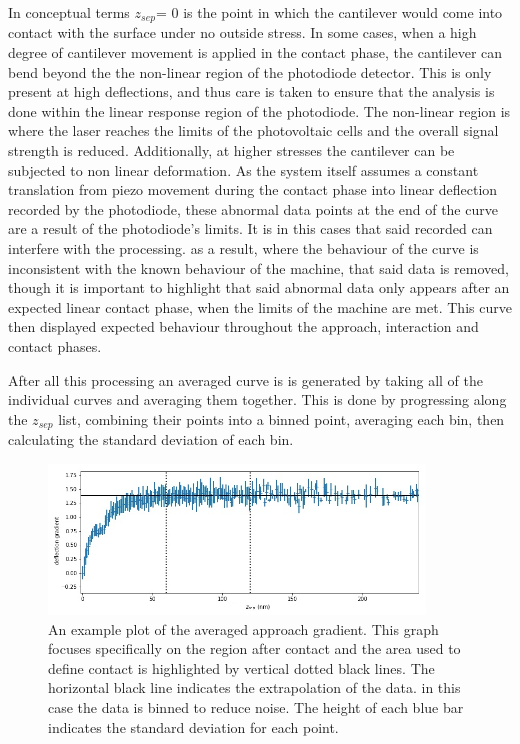 In conceptual terms $z_{sep} \textit{= 0}$ is the point in which the cantilever would come into contact with the surface under no outside stress. In some cases, when a high degree of cantilever movement is applied in the contact phase, the cantilever can bend beyond the the non-linear region of the photodiode detector. This is only present at high deflections, and thus care is taken to ensure that the analysis is done within the linear response region of the photodiode. The non-linear region is where the laser reaches the limits of the photovoltaic cells and the overall signal strength is reduced. Additionally, at higher stresses the cantilever can be subjected to non linear deformation. As the system itself assumes a constant translation from piezo movement during the contact phase into linear deflection recorded by the photodiode, these abnormal data points at the end of the curve are a result of the photodiode's limits. It is in this cases that said recorded can interfere with the processing. as a result, where the behaviour of the curve is inconsistent with the known behaviour of the machine, that said data is removed, though it is important to highlight that said abnormal data only appears after an expected linear contact phase, when the limits of the machine are met. This curve then displayed expected behaviour throughout the approach, interaction and contact phases.

After all this processing an averaged curve is is generated by taking all of the individual curves and averaging them together. This is done by progressing along the $z_{sep}$ list, combining their points into a binned point, averaging each bin, then calculating the standard deviation of each bin.

\begin{figure}[h!!!!]    
        \begin{center}
          \includegraphics[width=100mm]{chapter4/gradientGraph.png}
\end{center}
\caption{An example plot of the averaged approach gradient. This graph focuses specifically on the region after contact and the area used to define contact is highlighted by vertical dotted black lines. The horizontal black line indicates the extrapolation of the data. in this case the data is binned to reduce noise. The height of each blue bar indicates the standard deviation for each point.} %
\label{fig:EgAvgDeriv}                
\end{figure}

